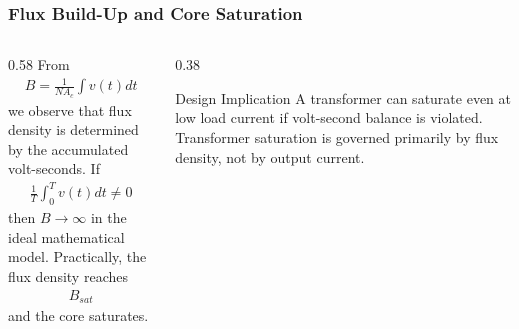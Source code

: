 \begin{frame} 
    \frametitle{Flux Build-Up and Core Saturation} 
    \begin{columns} 
        \begin{column}{0.58\textwidth} 
            From \begin{align} B = \frac{1}{NA_c} \int v(t)dt 
            \end{align} 
            we observe that flux density is determined by the accumulated volt-seconds. 
            \vspace{0.15cm} 
            If 
            \begin{align} 
                \frac{1}{T} \int_0^T v(t)dt \neq 0 
            \end{align} 
            then $B \rightarrow \infty$ in the ideal mathematical model. Practically, the flux density reaches 
            \begin{align} 
                B_{sat} 
            \end{align} 
            and the core saturates. 
        \end{column} 
        \begin{column}{0.38\textwidth} 
            \begin{block}{Design Implication} 
                A transformer can saturate even at low load current if volt-second balance is violated. 
                \vspace{0.15cm} 
                Transformer saturation is governed primarily by flux density, not by output current. 
            \end{block} 
        \end{column} 
    \end{columns} 
\end{frame}

